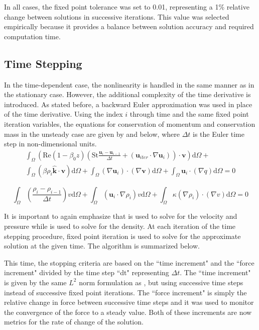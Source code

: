 \documentclass[12pt]{article}
\begin{document}
In all cases, the fixed point tolerance was set to 0.01, representing a 1\% relative change between solutions in successive iterations. This value was selected empirically because it provides a balance between solution accuracy and required computation time.

\subsection{Time Stepping}

In the time-dependent case, the nonlinearity is handled in the same manner as in the stationary case. However, the additional complexity of the time derivative is introduced. As stated before, a backward Euler approximation was used in place of the time derivative. Using the index $i$ through time and the same fixed point iteration variables, the equations for conservation of momentum and conservation mass in the unsteady case are given by  and  below, where $\Delta t$ is the Euler time step in non-dimensional units.
\begin{equation}
\begin{split}
\label{eq:weaktimeNS}
\int_\Omega(\text{Re}(1-\beta_0z)\left(\text{St}\frac{\mathbf{u}_i-\mathbf{u}_{i-1}}{\Delta t}+(\mathbf{u}_{iter}\cdot\nabla\mathbf{u}_i)\right)\cdot\mathbf{v})\text{d}\Omega+\\
\int_\Omega(\beta\rho_i\mathbf{\hat{k}}\cdot\mathbf{v})\text{d}\Omega+
\int_\Omega(\nabla\mathbf{u}_i)\cdot(\nabla\mathbf{v})\text{d}\Omega+\int_\Omega\mathbf{u}_i\cdot(\nabla q)\text{d}\Omega=0
\end{split}
\end{equation}

\begin{equation}
\label{eq:weaktimeconvdiff}
\int_\Omega\left(\frac{\rho_i-\rho_{i-1}}{\Delta t}\right)v\text{d}\Omega + \int_\Omega(\mathbf{u}_i\cdot\nabla\rho_i)v\text{d}\Omega+\int_\Omega\kappa(\nabla\rho_i)\cdot(\nabla  v)\text{d}\Omega=0
\end{equation}

It is important to again emphasize that  is used to solve for the velocity and pressure while  is used to solve for the density. At each iteration of the time stepping procedure, fixed point iteration is used to solve for the approximate solution at the given time. The algorithm is summarized below.

This time, the stopping criteria are based on the ``time increment" and the ``force increment" divided by the time step ``dt" representing $\Delta t$. The ``time increment" is given by the same $L^2$ norm formulation as , but using successive time steps instead of successive fixed point iterations. The ``force increment" is simply the relative change in force between successive time steps and it was used to monitor the convergence of the force to a steady value. Both of these increments are now metrics for the rate of change of the solution.
\end{document}
